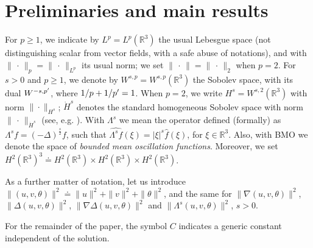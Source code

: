 \documentclass[a4paper]{article}
\newcommand{\R}{\mathbb{R}}
\begin{document}
  \section{Preliminaries and main results} \label{sec:preliminaries-main}
%
  For $p \geq 1$, we indicate by $L^p=L^p(\R^3)$ the usual Lebesgue
  space (not distinguishing scalar from vector fields, with a safe abuse of 
  notations), and with $\|\, \cdot\, \|_p=\|\, \cdot\, \|_{L^p}$ its usual
  norm; we set $\|\, \cdot\, \|= \|\, \cdot\, \|_2 $ when $p=2$.  For
  $s >0$ and $p\ge 1$, we denote by $W^{s,p}=W^{s,p}(\mathbb{R}^3)$
  the Sobolev space, with its dual $W^{-s, p\rq{}}$, where
  $1/p+1/p\rq{}=1$. When $p=2$, we write $H^s=W^{s,2}(\mathbb{R}^3)$
  with norm $\|\cdot\|_{H^s}$; $\dot H^s$ denotes the standard
  homogeneous Sobolev space with norm $\|\, \cdot\, \|_{\dot
    H^s}$ (see, e.g. \cite{Ad}). With $\Lambda^s$ we mean the operator defined (formally) as
  $\Lambda^s f=(-\Delta)^\frac{s}{2} f$, such that
  $\widehat{\Lambda^s f}(\xi)=|\xi|^s\hat{f}(\xi)$, for
  $\xi \in \mathbb{R}^3$. Also, with \textrm{BMO} we denote the space of
  \emph{bounded mean oscillation functions}.
%
  Moreover, we set $H^2(\R^3) ^3\doteq H^2(\R^3) \times H^2(\R^3)
 \times H^2(\R^3)$. 

 As a further matter of notation, let us introduce 
    $\| (u, v, \theta)\|^2\doteq \| u\|^2 +\| v\|^2+\| \theta\|^2$,
    and the same for  $\|\nabla (u, v, \theta)\|^2$, $\|\Delta (u,
v, \theta)\|^2$, $\|\nabla\Delta (u, v, \theta)\|^2$ and $\|\Lambda^s ( u, v, \theta)\|^2$, $s>0$.
  
 For the remainder of the paper, the symbol $C$ indicates a generic constant
  independent of the solution.
  
\end{document}
